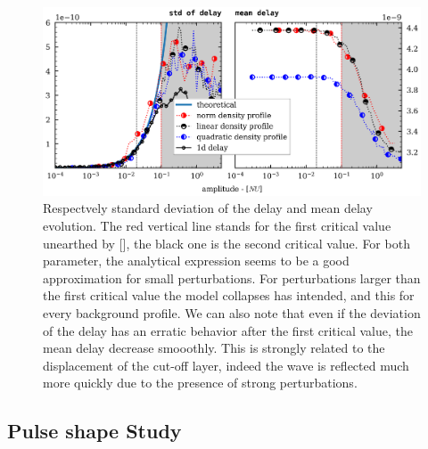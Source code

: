 \documentclass[11pt,a4paper]{report}
\begin{document}
\begin{figure}[H]
    \centering
    \includegraphics[width=1\linewidth]{./figures/delay_amp_norm_2.png}
    \caption{Respectvely standard deviation of the delay and mean delay evolution. The red vertical line stands for the first critical value unearthed by [], the black one is the second critical value. For both parameter,
        the analytical expression seems to be a good approximation for small perturbations. For perturbations larger than the first critical value the model collapses has intended, and this for every background profile. We can also note that even if the deviation of the delay has an erratic behavior after the first critical value, the mean delay decrease smooothly.
        This is strongly related to the displacement of the cut-off layer, indeed the wave is reflected much more quickly due to the presence of strong perturbations.}
    \label{fig:barrier}
\end{figure}

\subsection{Pulse shape Study}
\end{document}
